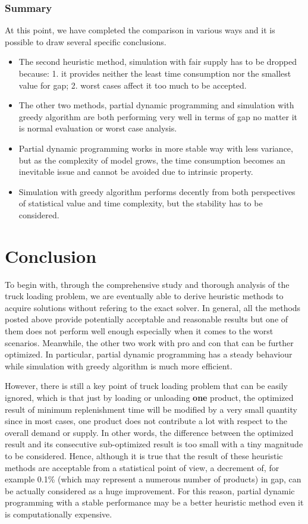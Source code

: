 \documentclass{article}
\begin{document}
\subsubsection{Summary}
At this point, we have completed the comparison in various ways and it is possible to draw several specific conclusions.

\begin{itemize}
\item The second heuristic method, simulation with fair supply has to be dropped because: 1. it provides neither the least time consumption nor the smallest value for gap; 2. worst cases affect it too much to be accepted.
\item The other two methods, partial dynamic programming and simulation with greedy algorithm are both performing very well in terms of gap no matter it is normal evaluation or worst case analysis.
\item Partial dynamic programming works in more stable way with less variance, but as the complexity of model grows, the time consumption becomes an inevitable issue and cannot be avoided due to intrinsic property.
\item Simulation with greedy algorithm performs decently from both perspectives of statistical value and time complexity, but the stability has to be considered.
\end{itemize}

\section{Conclusion }
To begin with, through the comprehensive study and thorough analysis of the truck loading problem, we are eventually able to derive heuristic methods to acquire solutions without refering to the exact solver. In general, all the methods posted above provide potentially acceptable and reasonable results but one of them does not perform well enough especially when it comes to the worst scenarios. Meanwhile, the other two work with pro and con that can be further optimized. In particular, partial dynamic programming has a steady behaviour while simulation with greedy algorithm is much more efficient. 

However, there is still a key point of truck loading problem that can be easily ignored, which is that just by loading or unloading \textbf{one} product, the optimized result of minimum replenishment time will be modified by a very small quantity since in most cases, one product does not contribute a lot with respect to the overall demand or supply. In other words, the difference between the optimized result and its consecutive sub-optimized result is too small with a tiny magnitude to be considered. Hence, although it is true that the result of these heuristic methods are acceptable from a statistical point of view, a decrement of, for example 0.1\% (which may represent a numerous number of products) in gap, can be actually considered as a huge improvement. For this reason, partial dynamic programming with a stable performance may be a better heuristic method even it is computationally expensive.
\end{document}
